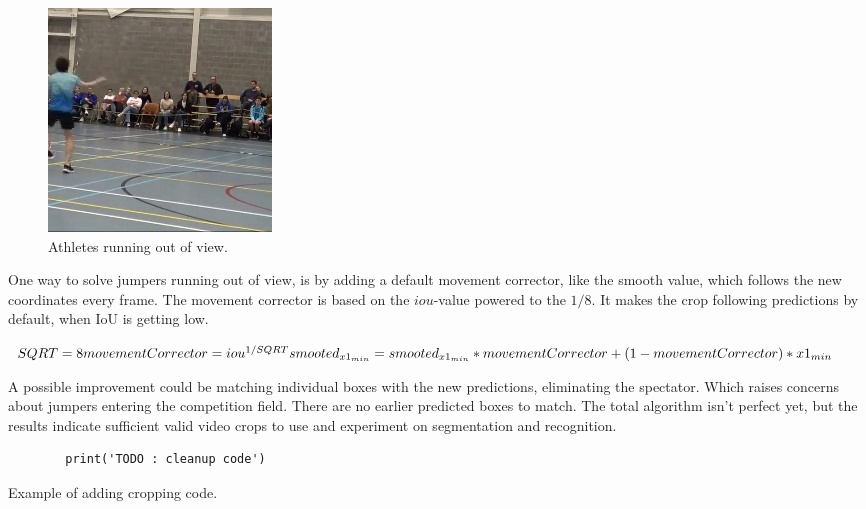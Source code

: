 
\begin{figure}
    \centering
    \includegraphics[width=0.45\linewidth]{img/1241_1093_cropped}
    \caption[dd3-crop-error]{Athletes running out of view.}
    \label{fig:dd3-crop-error-out-of-view}
\end{figure}

One way to solve jumpers running out of view, is by adding a default movement corrector, like the smooth value, which follows the new coordinates every frame. The movement corrector is based on the \(iou\)-value powered to the \(1/8\). It makes the crop following predictions by default, when IoU is getting low.


\begin{math}
    SQRT = 8 \\
    movementCorrector = iou^{1/SQRT} \\
    smooted_{x1_{min}} = smooted_{x1_{min}} * movementCorrector + (1 - movementCorrector) * {x1_{min}}
\end{math}



A possible improvement could be matching individual boxes with the new predictions, eliminating the spectator. Which raises concerns about jumpers entering the competition field. There are no earlier predicted boxes to match.
The total algorithm isn't perfect yet, but the results indicate sufficient valid video crops to use and experiment on segmentation and recognition.

\begin{listing}
    \begin{verbatim}
        print('TODO : cleanup code')
    \end{verbatim}
    \caption[Example codefragment]{Example of adding cropping code.}
    \label{code:localization}
\end{listing}

